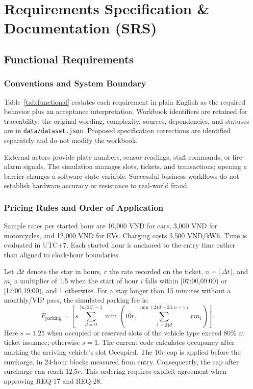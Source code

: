\chapter{Requirements Specification \& Documentation (SRS)}
\section{Functional Requirements}
\subsection{Conventions and System Boundary}
Table~\ref{tab:functional} restates each requirement in plain English as the required behavior plus an acceptance interpretation. Workbook identifiers are retained for traceability; the original wording, complexity, sources, dependencies, and statuses are in \texttt{data/dataset.json}. Proposed specification corrections are identified separately and do not modify the workbook.

External actors provide plate numbers, sensor readings, staff commands, or fire-alarm signals. The simulation manages slots, tickets, and transactions; opening a barrier changes a software state variable. Successful business workflows do not establish hardware accuracy or resistance to real-world fraud.
\clearpage


\subsection{Pricing Rules and Order of Application}
Sample rates per started hour are 10,000 VND for cars, 3,000 VND for motorcycles, and 12,000 VND for EVs. Charging costs 3,500 VND/kWh. Time is evaluated in UTC+7. Each started hour is anchored to the entry time rather than aligned to clock-hour boundaries.

Let $\Delta t$ denote the stay in hours, $r$ the rate recorded on the ticket, $n=\lceil\Delta t\rceil$, and $m_i$ a multiplier of 1.5 when the start of hour $i$ falls within [07:00,09:00) or [17:00,19:00), and 1 otherwise. For a stay longer than 15 minutes without a monthly/VIP pass, the simulated parking fee is:
\begin{equation}
F_{\mathrm{parking}}=\left\lfloor s\sum_{d=0}^{\lceil n/24\rceil-1}\min\left(10r,\sum_{i=24d}^{\min(24d+23,n-1)} r m_i\right)\right\rfloor .
\end{equation}
Here $s=1.25$ when occupied or reserved slots of the vehicle type exceed 80\% at ticket issuance; otherwise $s=1$. The current code calculates occupancy after marking the arriving vehicle's slot Occupied. The $10r$ cap is applied before the surcharge, in 24-hour blocks measured from entry. Consequently, the cap after surcharge can reach $12.5r$. This ordering requires explicit agreement when approving REQ-17 and REQ-28.

